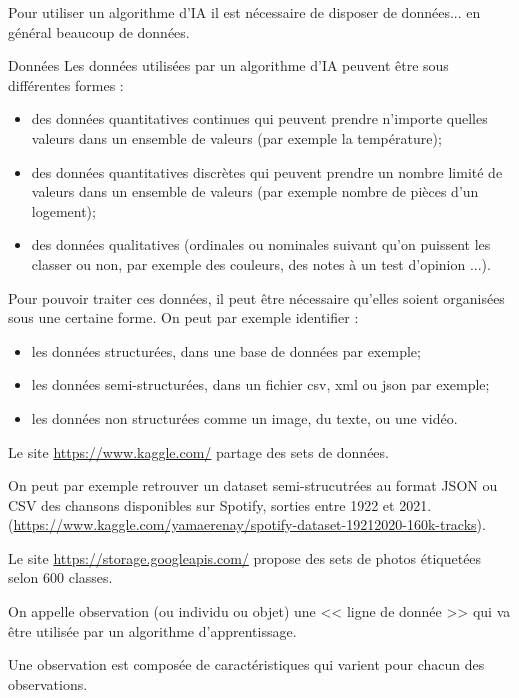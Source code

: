 Pour utiliser un algorithme d'IA il est nécessaire de disposer de données... en général beaucoup de données. 
\begin{defi}{Données}
Les données utilisées par un algorithme d'IA peuvent être sous différentes formes : 
\begin{itemize}
\item des données quantitatives continues qui peuvent prendre n'importe quelles valeurs dans un ensemble de valeurs (par exemple la température);
\item des données quantitatives discrètes qui peuvent prendre un nombre limité de valeurs dans un ensemble de valeurs (par exemple nombre de pièces d'un logement);
\item des données qualitatives (ordinales ou nominales suivant qu'on puissent les classer ou non, par exemple des couleurs, des notes à un test d'opinion ...).
\end{itemize}

\end{defi}

Pour pouvoir traiter ces données, il peut être nécessaire qu'elles soient organisées sous une certaine forme. On peut par exemple identifier : 
\begin{itemize}
\item les données structurées, dans une base de données par exemple;
\item les données semi-structurées, dans un fichier csv, xml ou json par exemple;
\item les données non structurées comme un image, du texte, ou une vidéo.
\end{itemize}

\begin{exemple}
Le site \url{https://www.kaggle.com/} partage des sets de données. 

On peut par exemple retrouver un dataset semi-strucutrées au format JSON ou CSV des chansons disponibles sur Spotify, sorties entre 1922 et 2021. 
(\url{https://www.kaggle.com/yamaerenay/spotify-dataset-19212020-160k-tracks}).

Le site \url{https://storage.googleapis.com/} propose des sets de photos étiquetées selon 600 classes. 
\end{exemple}

\begin{defi}

On appelle observation (ou individu ou objet) une << ligne de donnée >> qui va être utilisée par un algorithme d'apprentissage. 

Une observation est composée de caractéristiques qui varient pour chacun des observations. 
\end{defi}

